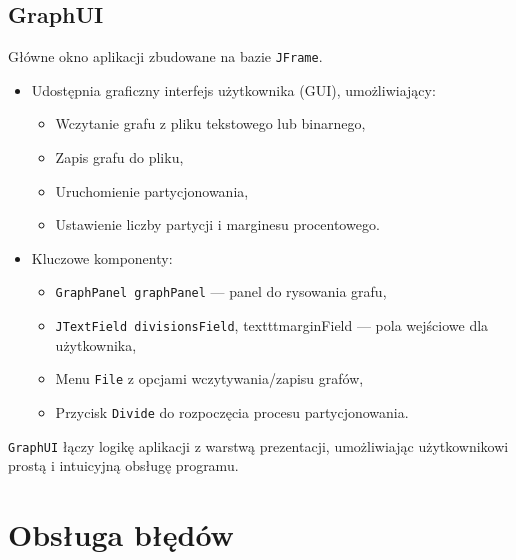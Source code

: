 \documentclass[a4paper,12pt]{article}
\begin{document}
\subsection*{GraphUI}
Główne okno aplikacji zbudowane na bazie \texttt{JFrame}.
\begin{itemize}
  \item Udostępnia graficzny interfejs użytkownika (GUI), umożliwiający:
    \begin{itemize}
        \item Wczytanie grafu z pliku tekstowego lub binarnego,
        \item Zapis grafu do pliku,
        \item Uruchomienie partycjonowania,
        \item Ustawienie liczby partycji i marginesu procentowego.
    \end{itemize}
   \item Kluczowe komponenty:
    \begin{itemize}
        \item \texttt{GraphPanel graphPanel} --- panel do rysowania grafu,
        \item \texttt{JTextField divisionsField}, texttt{marginField} --- pola wejściowe dla użytkownika,
        \item Menu \texttt{File} z opcjami wczytywania/zapisu grafów,
        \item Przycisk \texttt{Divide} do rozpoczęcia procesu partycjonowania.
    \end{itemize}
\end{itemize}
\texttt{GraphUI} łączy logikę aplikacji z warstwą prezentacji, umożliwiając użytkownikowi prostą i intuicyjną obsługę programu.

\section{Obsługa błędów}
\end{document}
